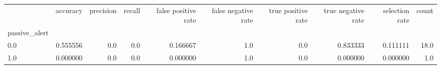 \begin{tabular}{lrrrrrrrrr}
\toprule
{} &  accuracy &  precision &  recall &  false positive rate &  false negative rate &  true positive rate &  true negative rate &  selection rate &  count \\
passive\_alert &           &            &         &                      &                      &                     &                     &                 &        \\
\midrule
0.0           &  0.555556 &        0.0 &     0.0 &             0.166667 &                  1.0 &                 0.0 &            0.833333 &        0.111111 &   18.0 \\
1.0           &  0.000000 &        0.0 &     0.0 &             0.000000 &                  1.0 &                 0.0 &            0.000000 &        0.000000 &    1.0 \\
\bottomrule
\end{tabular}
